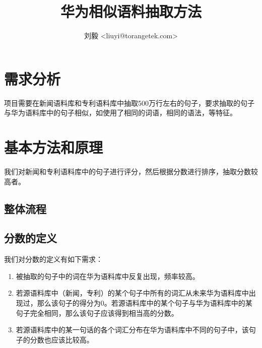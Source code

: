\documentclass{ctexart}
\begin{document}
\title{华为相似语料抽取方法}
\author{刘毅 <liuyi@torangetek.com>}
\maketitle
\section{需求分析}
项目需要在新闻语料库和专利语料库中抽取500万行左右的句子，要求抽取的句子与华为语料库中的句子相似，如使用了相同的词语，相同的语法，等特征。
\section{基本方法和原理}
我们对新闻和专利语料库中的句子进行评分，然后根据分数进行排序，抽取分数较高者。
\subsection{整体流程}


\subsection{分数的定义}
我们对分数的定义有如下需求：
\begin{enumerate}
    \item 被抽取的句子中的词在华为语料库中反复出现，频率较高。 
    \item 若源语料库中（新闻，专利）的某个句子中所有的词汇从未来华为语料库中出现过，那么该句子的得分为0。若源语料库中的某个句子与华为语料库中的某句子完全相同，那么该句子应该得到相当高的分数。
    \item 若源语料库中的某一句话的各个词汇分布在华为语料库中不同的句子中，该句子的分数也应该比较高。
\end{enumerate}
\end{document}
